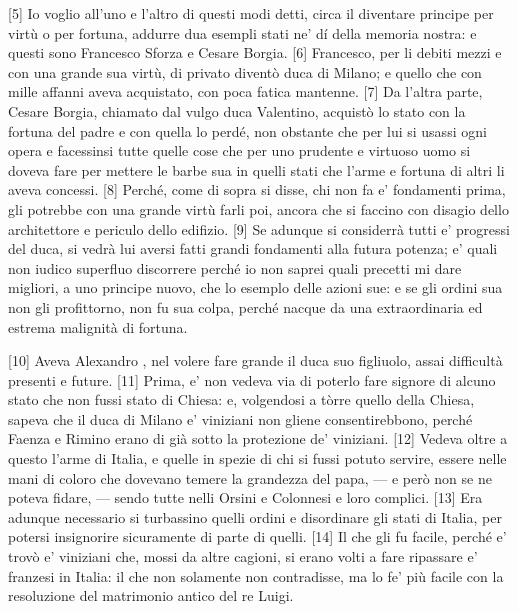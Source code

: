 {[}5{]} Io voglio all'uno e l'altro di questi modi detti, circa il
diventare principe per virtù o per fortuna, addurre dua esempli stati
ne' dí della memoria nostra: e questi sono Francesco Sforza e Cesare
Borgia. {[}6{]} Francesco, per li debiti mezzi e con una grande sua
virtù, di privato diventò duca di Milano; e quello che con mille affanni
aveva acquistato, con poca fatica mantenne. {[}7{]} Da l'altra parte,
Cesare Borgia, chiamato dal vulgo duca Valentino, acquistò lo stato con
la fortuna del padre e con quella lo perdé, non obstante che per lui si
usassi ogni opera e facessinsi tutte quelle cose che per uno prudente e
virtuoso uomo si doveva fare per mettere le barbe sua in quelli stati
che l'arme e fortuna di altri li aveva concessi. {[}8{]} Perché, come di
sopra si disse, chi non fa e' fondamenti prima, gli potrebbe con una
grande virtù farli poi, ancora che si faccino con disagio dello
architettore e periculo dello edifizio. {[}9{]} Se adunque si considerrà
tutti e' progressi del duca, si vedrà lui aversi fatti grandi fondamenti
alla futura potenza; e' quali non iudico superfluo discorrere perché io
non saprei quali precetti mi dare migliori, a uno principe nuovo, che lo
esemplo delle azioni sue: e se gli ordini sua non gli profittorno, non
fu sua colpa, perché nacque da una extraordinaria ed estrema malignità
di fortuna.

\pagebreak

{[}10{]} Aveva Alexandro , nel volere fare grande il duca suo
figliuolo, assai difficultà presenti e future. {[}11{]} Prima, e' non
vedeva via di poterlo fare signore di alcuno stato che non fussi stato
di Chiesa: e, volgendosi a tòrre quello della Chiesa, sapeva che il duca
di Milano e' viniziani non gliene consentirebbono, perché Faenza e
Rimino erano di già sotto la protezione de' viniziani. {[}12{]} Vedeva
oltre a questo l'arme di Italia, e quelle in spezie di chi si fussi
potuto servire, essere nelle mani di coloro che dovevano temere la
grandezza del papa, --- e però non se ne poteva fidare, --- sendo tutte
nelli Orsini e Colonnesi e loro complici. {[}13{]} Era adunque
necessario si turbassino quelli ordini e disordinare gli stati di
Italia, per potersi insignorire sicuramente di parte di quelli. {[}14{]}
Il che gli fu facile, perché e' trovò e' viniziani che, mossi da altre
cagioni, si erano volti a fare ripassare e' franzesi in Italia: il che
non solamente non contradisse, ma lo fe' più facile con la resoluzione
del matrimonio antico del re Luigi.

